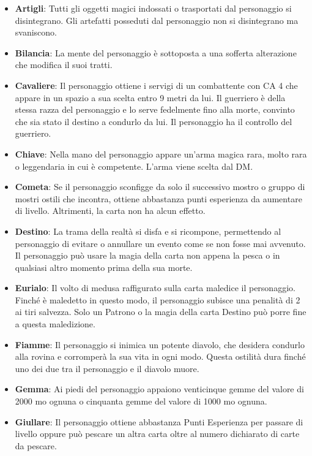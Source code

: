 \begin{multicols}{2}
\noindent\begin{itemize}[leftmargin=*] \setlength{\itemsep}{0pt}
\item \textbf{Artigli}: Tutti gli oggetti magici indossati o trasportati dal personaggio si disintegrano. Gli artefatti posseduti dal personaggio non si disintegrano ma svaniscono.
\item \textbf{Bilancia}: La mente del personaggio è sottoposta a una sofferta alterazione che modifica il suoi tratti.
\item \textbf{Cavaliere}: Il personaggio ottiene i servigi di un combattente con CA 4 che appare in un spazio a sua scelta entro 9 metri da lui. Il guerriero è della stessa razza del personaggio e lo serve fedelmente fino alla morte, convinto che sia stato il destino a condurlo da lui. Il personaggio ha il controllo del guerriero.
\item \textbf{Chiave}: Nella mano del personaggio appare un’arma magica rara, molto rara o leggendaria in cui è competente. L’arma viene scelta dal DM.
\item \textbf{Cometa}: Se il personaggio sconfigge da solo il successivo mostro o gruppo di mostri ostili che incontra, ottiene abbastanza punti esperienza da aumentare di livello. Altrimenti, la carta non ha alcun effetto.
\item \textbf{Destino}: La trama della realtà si disfa e si ricompone, permettendo al personaggio di evitare o annullare un evento come se non fosse mai avvenuto. Il personaggio può usare la magia della carta non appena la pesca o in qualsiasi altro momento prima della sua morte.
\item \textbf{Eurialo}: Il volto di medusa raffigurato sulla carta maledice il personaggio. Finché è maledetto in questo modo, il personaggio subisce una penalità di 2 ai tiri salvezza. Solo un Patrono o la magia della carta Destino può porre fine a questa maledizione.
\item \textbf{Fiamme}: Il personaggio si inimica un potente diavolo, che desidera condurlo alla rovina e corromperà la sua vita in ogni modo. Questa ostilità dura finché uno dei due tra il personaggio e il diavolo muore.
\item \textbf{Gemma}: Ai piedi del personaggio appaiono venticinque gemme del valore di 2000 mo ognuna o cinquanta gemme del valore di 1000 mo ognuna.
\item \textbf{Giullare}: Il personaggio ottiene abbastanza Punti Esperienza per passare di livello oppure può pescare un altra carta oltre al numero dichiarato di carte da pescare.

\end{itemize}
\end{multicols}
